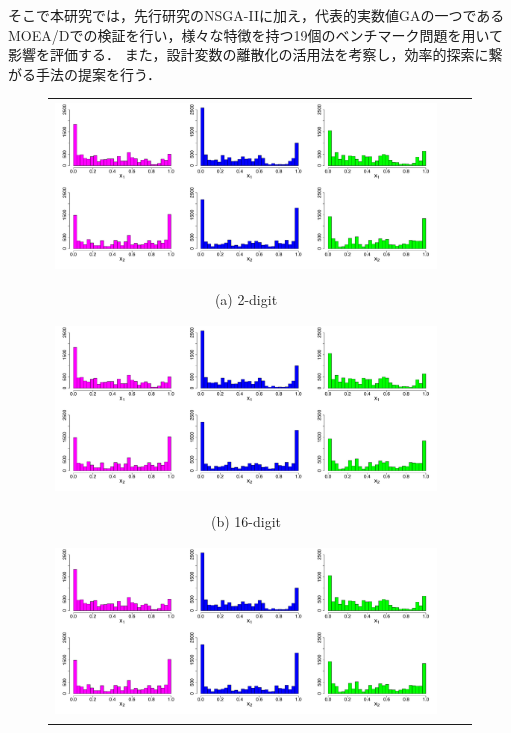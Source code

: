 \documentclass[../main/main]{subfiles}
\begin{document}
\begin{description}
\quad そこで本研究では，先行研究のNSGA-IIに加え，代表的実数値GAの一つであるMOEA/Dでの検証を行い，様々な特徴を持つ19個のベンチマーク問題を用いて影響を評価する．
また，設計変数の離散化の活用法を考察し，効率的探索に繋がる手法の提案を行う．
%
%
%
\begin{figure}[htbp]
\begin{tabular}{ccc}
\begin{minipage}{0.333\hsize}
\centering
\includegraphics[height=4.5cm,width=0.8\linewidth]{../figures/kaizen_hist_digi2.pdf}
\begin{center}
{\footnotesize (a) 2-digit}
\end{center}
\end{minipage}
\begin{minipage}{0.333\hsize}
\centering
\includegraphics[height=4.5cm,width=0.8\linewidth]{../figures/kaizen_hist_digi16.pdf}
\begin{center}
{\footnotesize (b) 16-digit}
\end{center}
\end{minipage}
\begin{minipage}{0.333\hsize}
\centering
\includegraphics[height=4.5cm,width=0.8\linewidth]{../figures/kaizen_hist_mod.pdf}

\end{minipage}
\end{tabular}
\end{figure}
\end{description}
\end{document}
